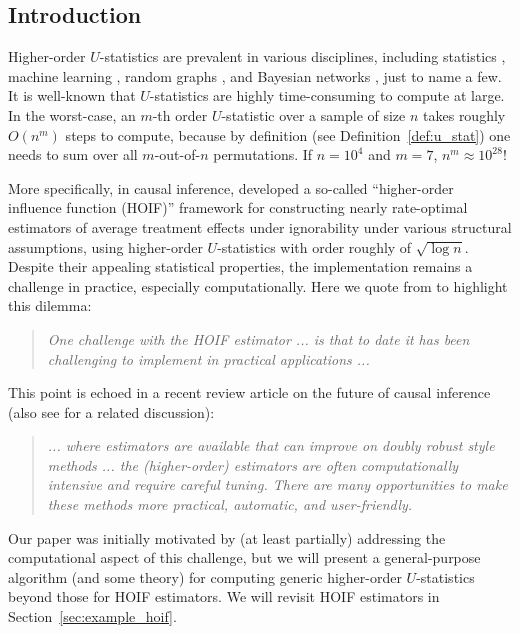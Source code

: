 \documentclass[sn-mathphys, natbib=false]{sn-jnl}
\theoremstyle{plain}
\theoremstyle{definition}
\begin{document}
\begin{bibunit}[agsm]

\setcounter{page}{1}

\section{Introduction}
\label{sec:intro}
Higher-order $U$-statistics are prevalent in various disciplines, including statistics \citep{robins2008higher, bonvini2022fast, bonvini2024doubly, yao2018testing, breunig2024adaptive, shao2025u}, machine learning \citep{clemenccon2008ranking, clemenccon2013maximal}, random graphs \citep{chatterjee2024higher}, and Bayesian networks \citep{shpitser2011efficient}, just to name a few. It is well-known that $U$-statistics are highly time-consuming to compute at large. In the worst-case, an $m$-th order $U$-statistic over a sample of size $n$ takes roughly $O (n^{m})$ steps to compute, because by definition (see Definition~\ref{def:u_stat}) one needs to sum over all $m$-out-of-$n$ permutations. If $n = 10^{4}$ and $m = 7$, $n^{m} \approx 10^{28}$! 

More specifically, in causal inference, \citet{robins2008higher} developed a so-called ``higher-order influence function (HOIF)'' framework for constructing nearly rate-optimal estimators of average treatment effects under ignorability under various structural assumptions, using higher-order $U$-statistics with order roughly of $\sqrt{\log n}$. Despite their appealing statistical properties, the implementation remains a challenge in practice, especially computationally. Here we quote from \citet{wager2024causal} to highlight this dilemma:
\begin{quote}
\emph{One challenge with the HOIF estimator ... is that to date it has been challenging to implement in practical applications ...}
\end{quote}
This point is echoed in a recent review article on the future of causal inference \citep{cinelli2025challenges} (also see \citet{zheng2025perturbed} for a related discussion):
\begin{quote}
\emph{... where estimators are available that can improve on doubly robust style methods ... the (higher-order) estimators are often computationally intensive and require careful tuning. There are many opportunities to make these methods more practical, automatic, and user-friendly.}
\end{quote}

Our paper was initially motivated by (at least partially) addressing the computational aspect of this challenge, but we will present a general-purpose algorithm (and some theory) for computing generic higher-order $U$-statistics beyond those for HOIF estimators. We will revisit HOIF estimators in Section~\ref{sec:example_hoif}. 


\end{bibunit}
\end{document}
